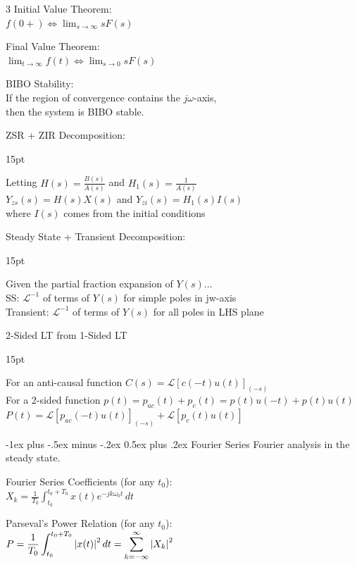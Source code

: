 \documentclass[12pt,landscape,letterpaper]{article}
\makeatletter
\renewcommand{\section}{\@startsection{section}{1}{0mm}%
                                {-1ex plus -.5ex minus -.2ex}%
                                {0.5ex plus .2ex}%
                                {\normalfont\normalsize\bfseries}}
\newcommand{\tab}{\hspace{0.02\textwidth}}
\newcommand{\ds}{\displaystyle}
\newenvironment{tabbed}
{
\vspace{-\parskip}
\begin{adjustwidth}{15pt}{}
}
{\end{adjustwidth}}
\makeatother
\begin{document}
\begin{multicols*}{3}
Initial Value Theorem:\\
\tab $\ds f(0+) \Leftrightarrow \lim_{s\rightarrow\infty} sF(s)$

Final Value Theorem:\\
\tab $\ds \lim_{t\rightarrow\infty} f(t) \Leftrightarrow \lim_{s\rightarrow 0} sF(s)$

BIBO Stability:\\
\tab If the region of convergence contains the $j\omega$-axis,\\
\tab then the system is BIBO stable.

ZSR + ZIR Decomposition:\\
\begin{tabbed}
Letting $H(s) = \frac{B(s)}{A(s)}$ and $H_1(s) = \frac{1}{A(s)}$\\
$Y_{zs}(s) = H(s)X(s)$ \quad and \quad $Y_{zi}(s) = H_1(s)I(s)$\\
where $I(s)$ comes from the initial conditions
\end{tabbed}

Steady State + Transient Decomposition:\\
\begin{tabbed}
Given the partial fraction expansion of $Y(s)$...\\
SS: $\mathcal{L}^{-1}$ of terms of $Y(s)$ for simple poles in jw-axis\\
Transient: $\mathcal{L}^{-1}$ of terms of $Y(s)$ for all poles in LHS plane
\end{tabbed}

2-Sided LT from 1-Sided LT
\begin{tabbed}
For an anti-causal function $C(s)=\mathcal{L}\left[c(-t)u(t)\right]_{(-s)}$\\
For a 2-sided function $p(t) = p_{ac}(t) + p_c(t) = p(t)u(-t) + p(t)u(t)$\\
$P(t)=\mathcal{L}\left[p_{ac}(-t)u(t)\right]_{(-s)} + \mathcal{L}\left[p_{c}(t)u(t)\right]$
\end{tabbed}

\section{Fourier Series}
\tab Fourier analysis in the steady state.

Fourier Series Coefficients (for any $t_0$):\\
\tab $\ds X_k = \frac{1}{T_0}\int_{t_0}^{t_0 + T_0}x(t)e^{-jk\omega_0t}\,dt$

Parseval's Power Relation (for any $t_0$):\\
\tab $\ds P = \frac{1}{T_0} \int_{t_0}^{t_0 + T_0}\abs{x(t)}^2\,dt = \sum_{k = -\infty}^{\infty}\abs{X_k}^2$


\end{multicols*}
\end{document}
